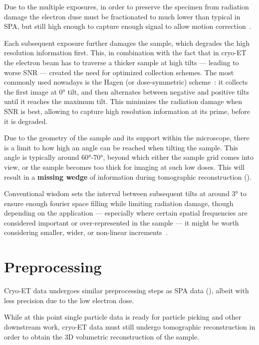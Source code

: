 Due to the multiple exposures, in order to preserve the specimen from radiation damage the electron duse must be fractionated to much lower than typical in SPA, but still high enough to capture enough signal to allow motion correction~\cite{mcewenRelevanceDosefractionationTomography1995}.

Each subsequent exposure further damages the sample, which degrades the high resolution information first.
This, in combination with the fact that in cryo-ET the electron beam has to traverse a thicker sample at high tilts --- leading to worse SNR --- created the need for optimized collection schemes.
The most commonly used nowadays is the Hagen (or dose-symmetric)  scheme~\cite{hagenImplementationCryoelectronTomography2017}: it collects the first image at \ang{0} tilt, and then alternates between negative and positive tilts until it reaches the maximum tilt.
This minimizes the radiation damage when SNR is best, allowing to capture high resolution information at its prime, before it is degraded.

Due to the geometry of the sample and its support within the microscope, there is a limit to how high an angle can be reached when tilting the sample.
This angle is typically around \ang{60}-\ang{70}, beyond which either the sample grid comes into view, or the sample becomes too thick for imaging at such low doses.
This will result in a \textbf{missing wedge} of information during tomographic reconstruction ().

Conventional wisdom sets the interval between subsequent tilts at around \ang{3} to ensure enough fourier space filling while limiting radiation damage, though depending on the application --- especially where certain spatial frequencies are considered important or over-represented in the sample --- it might be worth considering smaller, wider, or non-linear increments~\cite{copeCryoElectronTomographyStructural2011}.

\section{Preprocessing}
Cryo-ET data undergoes similar preprocessing steps as SPA data (), albeit with less precision due to the low electron dose.

While at this point single particle data is ready for particle picking and other downstream work, cryo-ET data must still undergo tomographic reconstruction in order to obtain the 3D volumetric reconstruction of the sample.

